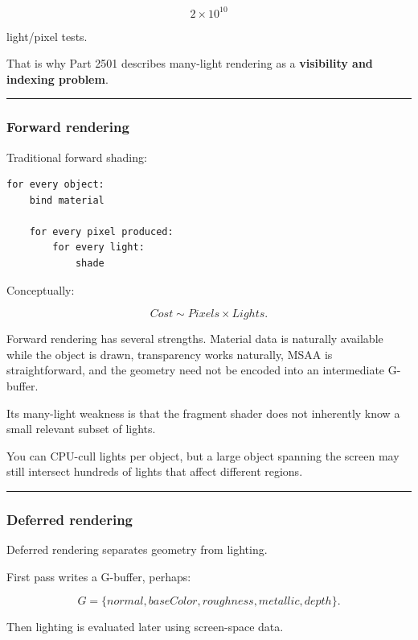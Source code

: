 \[
2\times10^{10}
\]

light/pixel tests.

That is why Part 2501 describes many-light rendering as a \textbf{visibility and indexing problem}.

\begin{center}\rule{0.5\linewidth}{0.5pt}\end{center}

\subsubsection{Forward rendering}\label{forward-rendering}

Traditional forward shading:

\begin{verbatim}
for every object:
    bind material

    for every pixel produced:
        for every light:
            shade
\end{verbatim}

Conceptually:

\[
Cost
\sim
Pixels\times Lights.
\]

Forward rendering has several strengths. Material data is naturally available while the object is drawn, transparency works naturally, MSAA is straightforward, and the geometry need not be encoded into an intermediate G-buffer.

Its many-light weakness is that the fragment shader does not inherently know a small relevant subset of lights.

You can CPU-cull lights per object, but a large object spanning the screen may still intersect hundreds of lights that affect different regions.

\begin{center}\rule{0.5\linewidth}{0.5pt}\end{center}

\subsubsection{Deferred rendering}\label{deferred-rendering}

Deferred rendering separates geometry from lighting.

First pass writes a G-buffer, perhaps:

\[
G=
\{
normal,
baseColor,
roughness,
metallic,
depth
\}.
\]

Then lighting is evaluated later using screen-space data.

